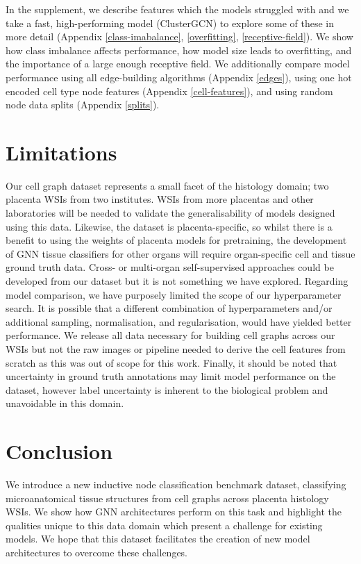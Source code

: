 \documentclass{article}
\begin{document}
In the supplement, we describe features which the models struggled with and we take a fast, high-performing model (ClusterGCN) to explore some of these in more detail (Appendix \ref{class-imabalance}, \ref{overfitting}, \ref{receptive-field}). We show how class imbalance affects performance, how model size leads to overfitting, and the importance of a large enough receptive field. We additionally compare model performance using all edge-building algorithms (Appendix \ref{edges}), using one hot encoded cell type node features (Appendix \ref{cell-features}), and using random node data splits (Appendix \ref{splits}).

\section{Limitations}
\label{limitations}

Our cell graph dataset represents a small facet of the histology domain; two placenta WSIs from two institutes. WSIs from more placentas and other laboratories will be needed to validate the generalisability of models designed using this data. Likewise, the dataset is placenta-specific, so whilst there is a benefit to using the weights of placenta models for pretraining, the development of GNN tissue classifiers for other organs will require organ-specific cell and tissue ground truth data. Cross- or multi-organ self-supervised approaches could be developed from our dataset but it is not something we have explored. Regarding model comparison, we have purposely limited the scope of our hyperparameter search. It is possible that a different combination of hyperparameters and/or additional sampling, normalisation, and regularisation, would have yielded better performance. We release all data necessary for building cell graphs across our WSIs but not the raw images or pipeline needed to derive the cell features from scratch as this was out of scope for this work. Finally, it should be noted that uncertainty in ground truth annotations may limit model performance on the dataset, however label uncertainty is inherent to the biological problem and unavoidable in this domain.

\section{Conclusion}

We introduce a new inductive node classification benchmark dataset, classifying microanatomical tissue structures from cell graphs across placenta histology WSIs. We show how GNN architectures perform on this task and highlight the qualities unique to this data domain which present a challenge for existing models. We hope that this dataset facilitates the creation of new model architectures to overcome these challenges.
\end{document}
